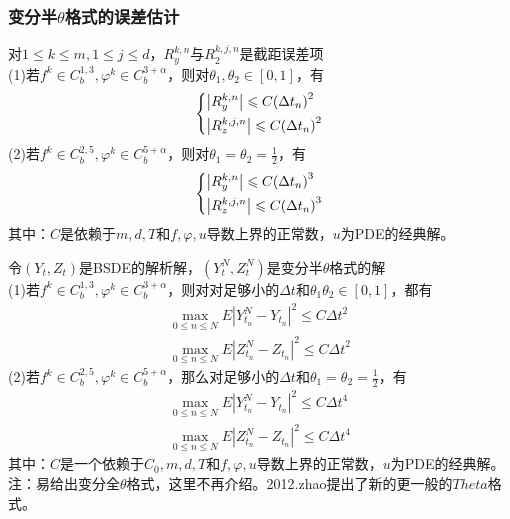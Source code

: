 		\subsubsection{变分半$\theta$格式的误差估计}
			对$1 \leqslant k \leqslant m,1 \leqslant j \leqslant d$，$R_y^{k,n}$与$R_2^{k,j,n}$是截距误差项\\
			\noindent (1)若$f^{k} \in C_b^{1,3},{\varphi}^k \in C_b^{3+\alpha}$，则对$\theta_1,\theta_2 \in [0,1]$，有
					\begin{equation*}
						\centering
					\left\{\begin{lgathered}
					{\left| {R_y^{k,n}} \right| \leqslant C{{\left( {\Delta {t_n}} \right)}^2}}\\
					{\left| {R_z^{k,j,n}} \right| \leqslant C{{\left( {\Delta {t_n}} \right)}^2}}
					\end{lgathered} \right.
					\end{equation*}
			\noindent (2)若$f^{k} \in C_b^{2,5},{\varphi}^k  \in C_b^{5+\alpha}$，则对$\theta_1=\theta_2 =\frac 12$，有
					\begin{equation*}
						\centering
					\left\{\begin{lgathered}
					{\left| {R_y^{k,n}} \right| \leqslant C{{\left( {\Delta {t_n}} \right)}^3}}\\
					{\left| {R_z^{k,j,n}} \right| \leqslant C{{\left( {\Delta {t_n}} \right)}^3}}
					\end{lgathered} \right.
					\end{equation*}
			 其中：$C$是依赖于$m,d,T$和$f,\varphi,u$导数上界的正常数，$u$为PDE的经典解。
			 \par
			 令$(Y_t,Z_t)$是BSDE的解析解，$(Y_t^N,Z_t^N)$是变分半$\theta$格式的解\\
			 \noindent (1)若$f^{k} \in C_b^{1,3},{\varphi}^k \in C_b^{3+\alpha}$，则对对足够小的$\Delta {t}$和$ \theta_1 \theta_2\in [0,1]$，都有
			\begin{align*}
			\mathop {\max }\limits_{0 \leqslant n \leqslant N}E{|Y_{t_n}^N-Y_{t_n}|}^2 \leqslant C{\Delta {t}}^2 \\
			\mathop {\max }\limits_{0 \leqslant n \leqslant N}E{|Z_{t_n}^N-Z_{t_n}|}^2 \leqslant C{\Delta {t}}^2 \end{align*}
			 \noindent (2)若$f^{k} \in C_b^{2,5},{\varphi}^k\in C_b^{5+\alpha}$，那么对足够小的$\Delta {t}$和$\theta_1=\theta_2=\frac 12$，有
			\begin{align*}
			\mathop {\max }\limits_{0 \leqslant n \leqslant N}E{|Y_{t_n}^N-Y_{t_n}|}^2 \leqslant C{\Delta {t}}^4 \\
			\mathop {\max }\limits_{0 \leqslant n \leqslant N}E{|Z_{t_n}^N-Z_{t_n}|}^2 \leqslant C{\Delta {t}}^4
			\end{align*}
			 其中：$C$是一个依赖于$C_0,m,d,T$和$f,\varphi,u$导数上界的正常数，$u$为PDE的经典解。\\
			注：易给出变分全$\theta$格式，这里不再介绍。2012.zhao\cite{2012.zhao}提出了新的更一般的$Theta$格式。


